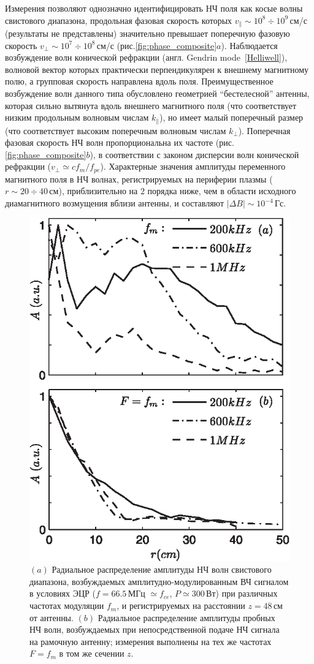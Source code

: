 \documentclass[autoref,10pt]{disser}
\begin{document}
Измерения позволяют однозначно идентифицировать НЧ поля как косые волны свистового диапазона, продольная фазовая скорость которых $v_{\parallel}\sim 10^8 \div 10^9$\,см/с (результаты не представлены) значительно превышает поперечную фазовую скорость $v_{\perp}\sim 10^7 \div 10^8$\,см/с (\mbox{рис.\ref{fig:phase_composite}$a$}). Наблюдается возбуждение волн конической рефракции (англ. Gendrin mode~\ref{Helliwell}), волновой вектор которых практически перпендикулярен к внешнему магнитному полю, а групповая скорость направлена вдоль поля. Преимущественное возбуждение волн данного типа обусловлено геометрией ``бестелесной'' антенны, которая сильно вытянута вдоль внешнего магнитного поля (что соответствует низким продольным волновым числам $k_{\parallel}$), но имеет малый поперечный размер (что соответствует высоким поперечным волновым числам $k_{\perp}$). Поперечная фазовая скорость НЧ волн пропорциональна их частоте (\mbox{рис.\ref{fig:phase_composite}$b$)}, в соответствии с законом дисперсии волн конической рефракции ($v_{\perp}\simeq c f_m/f_{pe}$). Характерные значения амплитуды переменного магнитного поля в НЧ волнах, регистрируемых на периферии плазмы ($r\sim 20\div 40$\,см), приблизительно на $2$ порядка ниже, чем в области исходного диамагнитного возмущения вблизи антенны, и составляют $|\Delta B|\sim 10^{-4}$\,Гс.

\begin{figure}[H]
  \centering
  \includegraphics[width=0.5\columnwidth]{pics/param_vs_dir.eps}
  \caption{$(a)$ Радиальное распределение амплитуды НЧ волн свистового диапазона, возбуждаемых амплитудно-модулированным ВЧ сигналом в условиях ЭЦР ($f=66.5$\,МГц $\simeq f_{ce}$, $P\simeq 300$\,Вт) при различных частотах модуляции $f_{m}$, и регистрируемых на расстоянии $z=48$\,см от антенны. $(b)$ Радиальное распределение амплитуды пробных НЧ волн, возбуждаемых при непосредственной подаче НЧ сигнала на рамочную антенну; измерения выполнены на тех же частотах $F=f_m$ в том же сечении $z$.}
  \label{fig:param_vs_dir}
\end{figure} 
 
\end{document}
